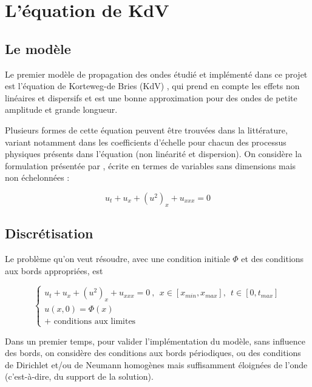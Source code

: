\section{L'équation de KdV}
\label{sec:KdV}

\subsection{Le modèle}

\indent Le premier modèle de propagation des ondes étudié et implémenté dans ce projet est l'équation de Korteweg-de Bries (KdV) , qui prend en compte les effets non linéaires et dispersifs et est une bonne approximation pour des ondes de petite amplitude et grande longueur. \cite{BBM1971}

 \indent Plusieurs formes de cette équation peuvent être trouvées dans la littérature, variant notamment dans les coefficients d'échelle pour chacun des processus physiques présents dans l'équation (non linéarité et dispersion). On considère la formulation présentée par \cite{BBM1971}, écrite en termes de variables sans dimensions mais non échelonnées : 

\begin{equation}
	\label{eq:KdVequation}
    u_t + u_x + (u^2)_x + u_{xxx} = 0
\end{equation}

\subsection{Discrétisation}

\indent Le problème qu'on veut résoudre, avec une condition initiale $\Phi$ et des conditions aux bords appropriées, est

\begin{equation*}
\begin{cases}
    u_t + u_x + (u^2)_x + u_{xxx} = 0 \ , \ \ x \in [x_{min},x_{max}], \ \ t \in [0, t_{max}] \\
    u(x,0) = \Phi(x) \\
    \text{+ conditions aux limites}
\end{cases}
\end{equation*}

\indent Dans un premier temps, pour valider l'implémentation du modèle, sans influence des bords, on considère des conditions aux bords périodiques, ou des conditions de Dirichlet et/ou de Neumann homogènes mais suffisamment éloignées de l'onde (c'est-à-dire, du support de la solution).

